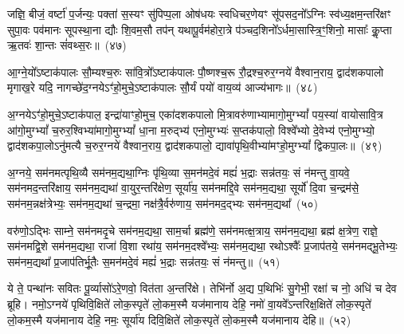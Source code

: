 {{\anuvakamend[{वा॒युस्ते॑ वाजि॒न् युङ्ङनु॒ त्वा र॑भे स्व॒स्ति मा॒ सन्त्रिच॑त्वारिꣳशच्च}]}%

जज्ञि॒ बीजं॒ वर्\mbox{}ष्टा॑ प॒र्जन्यः॒ पक्ता॑ स॒स्यꣳ सु॑पिप्प॒ला ओष॑धयः स्वधिचर॒णेयꣳ सू॑पसद॒नो᳚\-ऽग्निः स्व॑ध्य॒क्षम॒न्तरि॑क्षꣳ सुपा॒वः पव॑मानः सूपस्था॒ना द्यौः शि॒वम॒सौ तप॑न् यथापू॒र्वम॑होरा॒त्रे प॑ञ्चद॒शिनो᳚\-ऽर्धमा॒सास्त्रि॒ꣳ॒शिनो॒ मासाः᳚ कॢ॒प्ता ऋ॒तवः॑ शा॒न्तः सं॑वथ्स॒रः॥~(४७)

{\anuvakamend[{जज्ञि॒ बीज॒मेक॑त्रिꣳशत्}]}%

आ॒ग्ने॒यो᳚\-ऽष्टाक॑पालः सौ॒म्यश्च॒रुः सा॑वि॒त्रो᳚\-ऽष्टाक॑पालः पौ॒ष्णश्च॒रू रौ॒द्रश्च॒रुर॒ग्नये॑ वैश्वान॒राय॒ द्वाद॑श\-कपालो मृगाख॒रे यदि॒ नागच्छे॑द॒ग्नये\-ऽꣳ॑हो॒मुचे॒\-ऽष्टाक॑पालः सौ॒र्यं पयो॑ वाय॒व्य॑ आज्य॑भागः॥~(४८)

{\anuvakamend[{आ॒ग्ने॒यश्चतु॑र्विꣳशतिः}]}%

अ॒ग्नये\-ऽꣳ॑हो॒मुचे॒\-ऽष्टाक॑पाल॒ इन्द्रा॑याꣳहो॒मुच॒ एका॑\-दश\-कपालो मि॒त्रावरु॑णाभ्यामागो॒मुग्\-भ्यां᳚ पय॒स्या॑ वायोसावि॒त्र आ॑गो॒मुग्\-भ्यां᳚ च॒रुर॒श्विभ्या॑मागो॒मुग्\-भ्यां᳚ धा॒ना म॒रुद्भ्य॑ एनो॒मुग्भ्यः॑ स॒प्तक॑पालो॒ विश्वे᳚भ्यो दे॒वेभ्य॑ एनो॒मुग्भ्यो॒ द्वाद॑श\-कपा॒लो\-ऽनु॑मत्यै च॒रुर॒ग्नये॑ वैश्वान॒राय॒ द्वाद॑श\-कपालो॒ द्यावा॑पृथि॒वीभ्या॑मꣳहो॒मुग्\-भ्यां᳚ द्विकपा॒लः॥~(४९)

{\anuvakamend[{अ॒ग्नये\-ऽꣳ॑हो॒मुचे᳚ त्रि॒ꣳ॒शत्}]}%

अ॒ग्नये॒ सम॑नमत्पृथि॒व्यै सम॑नम॒द्यथा॒ग्निः पृ॑थि॒व्या स॒मन॑मदे॒वं मह्यं॑ भ॒द्राः सन्न॑तयः॒ सं न॑मन्तु वा॒यवे॒ सम॑नमद॒न्तरि॑क्षाय॒ सम॑नम॒द्यथा॑ वा॒युर॒न्तरि॑क्षेण॒ सूर्या॑य॒ सम॑नमद्दि॒वे सम॑नम॒द्यथा॒ सूर्यो॑ दि॒वा च॒न्द्रम॑से॒ सम॑नम॒न्नक्ष॑त्रेभ्यः॒ सम॑नम॒द्यथा॑ च॒न्द्रमा॒ नक्ष॑त्रै॒र्वरु॑णाय॒ सम॑नमद॒द्भ्यः सम॑नम॒द्यथा᳚~(५०)

वरु॑णो॒\-ऽद्भिः साम्ने॒ सम॑नमदृ॒चे सम॑नम॒द्यथा॒ साम॒र्चा ब्रह्म॑णे॒ सम॑नमत्क्ष॒त्राय॒ सम॑नम॒द्यथा॒ ब्रह्म॑ क्ष॒त्रेण॒ राज्ञे॒ सम॑नमद्वि॒शे सम॑नम॒द्यथा॒ राजा॑ वि॒शा रथा॑य॒ सम॑नम॒दश्वे᳚भ्यः॒ सम॑नम॒द्यथा॒ रथो\-ऽश्वैः᳚ प्र॒जा\-प॑तये॒ सम॑नमद्भू॒तेभ्यः॒ सम॑नम॒द्यथा᳚ प्र॒जा\-प॑तिर्भू॒तैः स॒मन॑मदे॒वं मह्यं॑ भ॒द्राः सन्न॑तयः॒ सं न॑मन्तु॥~(५१)

{\anuvakamend[{अ॒द्भ्यः सम॑नम॒द्यथा॒ मह्यं॑ च॒त्वारि॑ च}]}%

ये ते॒ पन्था॑नः सवितः पू॒र्व्यासो॑\-ऽरे॒णवो॒ वित॑ता अ॒न्तरि॑क्षे। तेभि॑र्नो अ॒द्य प॒थिभिः॑ सु॒गेभी॒ रक्षा॑ च नो॒ अधि॑ च देव ब्रूहि। नमो॒\-ऽग्नये॑ पृथिवि॒क्षिते॑ लोक॒स्पृते॑ लो॒कम॒स्मै यज॑मानाय देहि॒ नमो॑ वा॒यवे᳚\-ऽन्तरिक्ष॒क्षिते॑ लोक॒स्पृते॑ लो॒कम॒स्मै यज॑मानाय देहि॒ नमः॒ सूर्या॑य दिवि॒क्षिते॑ लोक॒स्पृते॑ लो॒कम॒स्मै यज॑मानाय देहि॥~(५२)

}
